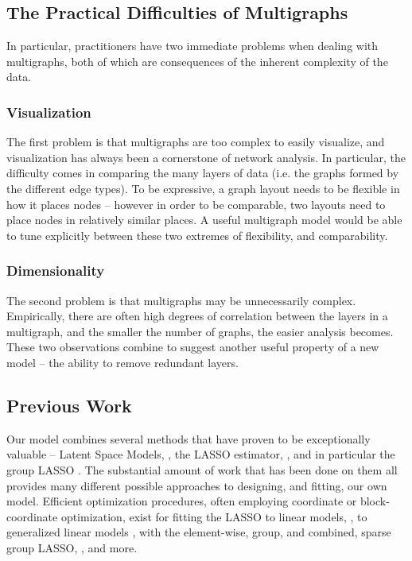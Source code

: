 \documentclass{article}
\begin{document}

\subsection{The Practical Difficulties of Multigraphs}
In particular, practitioners have two immediate problems when dealing with multigraphs, both of which are consequences of the inherent complexity of the data.

\subsubsection{Visualization}
The first problem is that multigraphs are too complex to easily visualize, and visualization has always been a cornerstone of network analysis. In particular, the difficulty comes in comparing the many layers of data (i.e. the graphs formed by the different edge types). To be expressive, a graph layout needs to be flexible in how it places nodes -- however in order to be comparable, two layouts need to place nodes in relatively similar places. A useful multigraph model would be able to tune explicitly between these two extremes of flexibility, and comparability.

\subsubsection{Dimensionality}
The second problem is that multigraphs may be unnecessarily complex. Empirically, there are often high degrees of correlation between the layers in a multigraph, and the smaller the number of graphs, the easier analysis becomes. These two observations combine to suggest another useful property of a new model -- the ability to remove redundant layers.


\subsection{Previous Work}


Our model combines several methods that have proven to be exceptionally valuable -- Latent Space Models, \cite{Hoff2002}, the LASSO estimator, \cite{Friedman2008}, and in particular the group LASSO \cite{Yuan2008}. The substantial amount of work that has been done on them all provides many different possible approaches to designing, and fitting, our own model. Efficient optimization procedures, often employing coordinate or block-coordinate optimization, exist for fitting the LASSO to linear models, \cite{Friedman2008}, to generalized linear models \cite{Friedman2010}, with the element-wise, group, and combined, sparse group LASSO, \cite{Vincent, Qin, Wu2008}, and more.
\end{document}
